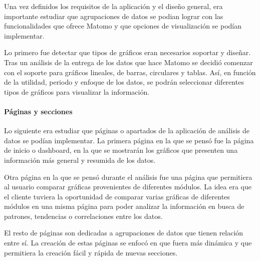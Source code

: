 Una vez definidos los requisitos de la aplicación y el diseño general, era importante estudiar que agrupaciones de datos 
se podian lograr con las funcionalidades que ofrece Matomo y que opciones de visualización se podían implementar. 

Lo primero fue detectar que tipos de gráficos eran necesarios soportar y diseñar. Tras un análisis de la entrega de los datos
que hace Matomo se decidió comenzar con el soporte para gráficos lineales, de barras, circulares y tablas. Así, en función 
de la utilidad, periodo y enfoque de los datos, se podrán seleccionar diferentes tipos de gráficos para visualizar la información.

\paragraph{Páginas y secciones}
Lo siguiente era estudiar que páginas o apartados de la aplicación de análisis de datos se podían implementar. La primera página en la que 
se pensó fue la página de inicio o dashboard, en la que se mostrarán los gráficos que presenten una información más general y resumida
de los datos. 

Otra página en la que se pensó durante el análisis fue una página que permitiera al usuario comparar gráficas provenientes de diferentes
módulos. La idea era que el cliente tuviera la oportunidad de comparar varias gráficas de diferentes módulos en una misma página para 
poder analizar la información en busca de patrones, tendencias o correlaciones entre los datos.

El resto de páginas son dedicadas a agrupaciones de datos que tienen relación entre sí. La creación de estas páginas se enfocó en 
que fuera más dinámica y que permitiera la creación fácil y rápida de nuevas secciones. 

